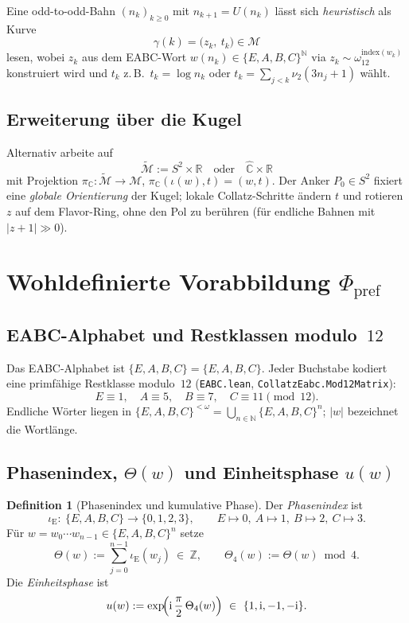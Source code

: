 \documentclass[11pt,a4paper]{article}
\theoremstyle{definition}
\newtheorem{definition}{Definition}[section]
\theoremstyle{remark}
\newcommand{\Z}{\mathbb{Z}}
\newcommand{\N}{\mathbb{N}}
\newcommand{\R}{\mathbb{R}}
\newcommand{\C}{\mathbb{C}}
\newcommand{\Chat}{\widehat{\C}}
\newcommand{\vii}{\nu_2}
\newcommand{\omegaT}{\omega_{12}}
\newcommand{\SigmaEABC}{\{E,A,B,C\}}
\newcommand{\iotaE}{\iota_{\mathrm{E}}}
\newcommand{\Phpref}{\Phi_{\mathrm{pref}}}
\begin{document}
Eine odd-to-odd-Bahn $(n_k)_{k\geq 0}$ mit $n_{k+1}=U(n_k)$ lässt sich
\emph{heuristisch} als Kurve
\[
\gamma(k)=\bigl(z_k,\ t_k\bigr)\in\mathcal{M}
\]
lesen, wobei $z_k$ aus dem EABC-Wort $w(n_k)\in\{E,A,B,C\}^{\N}$
via $z_k\sim\omegaT^{\mathrm{index}(w_k)}$ konstruiert wird und
$t_k$ z.\,B.\ $t_k=\log n_k$ oder $t_k=\sum_{j<k}\vii(3n_j+1)$ wählt.

\subsection{Erweiterung über die Kugel}

Alternativ arbeite auf
\[
\widetilde{\mathcal{M}}:=S^2\times\R
\quad\text{oder}\quad
\Chat\times\R
\]
mit Projektion $\pi_{\C}:\widetilde{\mathcal{M}}\to\mathcal{M}$,
$\pi_{\C}(\iota(w),t)=(w,t)$. Der Anker $P_0\in S^2$ fixiert eine
\emph{globale Orientierung} der Kugel; lokale Collatz-Schritte
ändern $t$ und rotieren $z$ auf dem Flavor-Ring, ohne den Pol zu
berühren (für endliche Bahnen mit $|z+1|\gg 0$).

\section{Wohldefinierte Vorabbildung \texorpdfstring{$\Phpref$}{Phi\_pref}}
\label{sec:phi}

\subsection{EABC-Alphabet und Restklassen modulo~$12$}

Das EABC-Alphabet ist $\SigmaEABC=\{E,A,B,C\}$.
Jeder Buchstabe kodiert eine primfähige Restklasse modulo~$12$
(\texttt{EABC.lean}, \texttt{CollatzEabc.Mod12Matrix}):
\[
E\equiv 1,\quad A\equiv 5,\quad B\equiv 7,\quad C\equiv 11\pmod{12}.
\]
Endliche Wörter liegen in $\SigmaEABC^{<\omega}=\bigcup_{n\in\N}\SigmaEABC^n$;
$|w|$ bezeichnet die Wortlänge.

\subsection{Phasenindex, \texorpdfstring{$\Theta(w)$}{Theta(w)} und Einheitsphase \texorpdfstring{$u(w)$}{u(w)}}

\begin{definition}[Phasenindex und kumulative Phase]
Der \emph{Phasenindex} ist
\[
\iotaE:\ \SigmaEABC\longrightarrow \{0,1,2,3\},\qquad
E\mapsto 0,\ A\mapsto 1,\ B\mapsto 2,\ C\mapsto 3.
\]
Für $w=w_0\cdots w_{n-1}\in\SigmaEABC^n$ setze
\[
\Theta(w):=\sum_{j=0}^{n-1}\iotaE(w_j)\ \in\ \Z,
\qquad
\Theta_{4}(w):=\Theta(w)\bmod 4.
\]
Die \emph{Einheitsphase} ist
\[
u(w):=\exp\!\Bigl(\mathrm{i}\,\frac{\pi}{2}\,\Theta_{4}(w)\Bigr)
\ \in\ \{1,\mathrm{i},-1,-\mathrm{i}\}.
\]
\end{definition}
\end{document}
